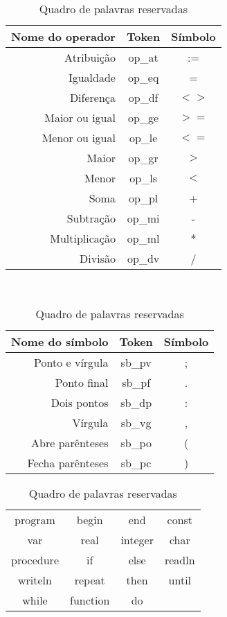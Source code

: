 \documentclass {article}
\begin{document}
			\begin{table}
				\begin{minipage}[ht]{0.5\textwidth}
					\centering
					\begin{tabular}{rcc}
						\toprule
						Nome do operador & Token & Símbolo\\
						\hline
						\hline
							Atribuição & op\_at & := \\
							Igualdade & op\_eq & = \\ 
							Diferença &  op\_df & $<>$ \\ 
							Maior ou igual & op\_ge & $>=$ \\ 
							Menor ou igual & op\_le & $<=$ \\ 
							Maior & op\_gr & $>$ \\
							Menor &op\_ls & $<$ \\ 
							Soma & op\_pl & + \\ 
							Subtração & op\_mi & - \\ 
							Multiplicação & op\_ml & * \\
							Divisão & op\_dv & / \\
						\bottomrule
					\end{tabular}
					\caption{Quadro de operadores}
					\label{table:op}
				\end{minipage}
				~
				\begin{minipage}[ht]{0.5\textwidth}
					\centering
					\begin{tabular}{rcc}
						\toprule
						Nome do símbolo & Token & Símbolo\\
						\hline
						\hline
							Ponto e vírgula & sb\_pv & ; \\
							Ponto final &  sb\_pf & . \\ 
							Dois pontos & sb\_dp & : \\ 
							Vírgula & sb\_vg & , \\
							Abre parênteses &sb\_po & ( \\ 
							Fecha parênteses & sb\_pc & ) \\ 
						\bottomrule
					\end{tabular}
					\caption{Quadro de símbolos}
					\label{table:simb}

					\vspace{5mm}
					
					\begin{tabular}{cccc}
						\toprule
						program & begin & end & const \\
						var & real & integer& char\\
						procedure & if & else & readln \\
						writeln & repeat & then & until\\
						while & function & do & \\
						\bottomrule
					\end{tabular}
					\caption{Quadro de palavras reservadas}
					\label{table:reserv}
				\end{minipage}
		
			\end{table}
\end{document}

